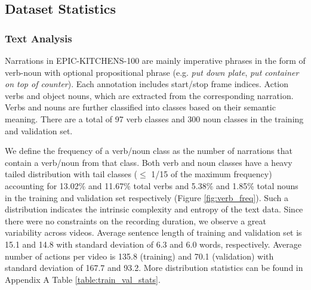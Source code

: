 \subsection{Dataset Statistics}

\subsubsection{Text Analysis}
Narrations in EPIC-KITCHENS-100 are mainly imperative phrases in the form of verb-noun with optional propositional phrase (e.g. \textit{put down plate}, \textit{put container on top of counter}). Each annotation includes start/stop frame indices. Action verbs and object nouns, which are extracted from the corresponding narration. Verbs and nouns are further classified into classes based on their semantic meaning. There are a total of 97 verb classes and 300 noun classes in the training and validation set.

We define the frequency of a verb/noun class as the number of narrations that contain a verb/noun from that class. Both verb and noun classes have a heavy tailed distribution with tail classes ($\le$ 1/15 of the maximum frequency) accounting for 13.02$\%$ and 11.67$\%$ total verbs and 5.38$\%$ and 1.85$\%$ total nouns in the training and validation set respectively (Figure \ref{fig:verb_freq}). Such a distribution indicates the intrinsic complexity and entropy of the text data. Since there were no constraints on the recording duration, we observe a great variability across videos. Average sentence length of training and validation set is 15.1 and 14.8 with standard deviation of 6.3 and 6.0 words, respectively. Average number of actions per video is 135.8 (training) and 70.1 (validation) with standard deviation of 167.7 and 93.2. More distribution statistics can be found in Appendix A Table \ref{table:train_val_stats}.


